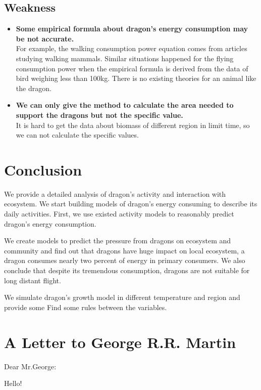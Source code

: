 \documentclass{mcmthesis}
\begin{document}
\subsection{Weakness}
\begin{itemize}
\item \textbf{Some empirical formula about dragon’s energy consumption may be not accurate.}\\
For example, the walking consumption power equation comes from articles studying walking mammals. Similar situations happened for the flying consumption power when the empirical formula is derived from the data of bird weighing less than 100kg. There is no existing theories for an animal like the dragon.
\item \textbf{We can only give the method to calculate the area needed to support the dragons but not the specific value.}\\
It is hard to get the data about biomass of different region in limit time, so  we can not calculate the specific values.
\end{itemize}

\section{Conclusion}
We provide a detailed analysis of dragon’s activity and interaction with ecosystem. We start building models of dragon’s energy consuming to describe its daily activities. First, we use existed activity models to reasonably predict dragon’s energy consumption.

We create models to predict the pressure from dragons on ecosystem and community and find out that dragons have huge impact on local ecosystem, a dragon consumes nearly two percent of energy in primary consumers. We also conclude that despite its tremendous consumption, dragons are not suitable for long distant flight.

We simulate dragon’s growth model in different temperature and region and provide some Find some rules between the variables.

\section{A Letter to George R.R. Martin}
Dear Mr.George:

Hello!
\end{document}
